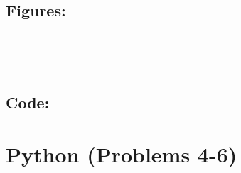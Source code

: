 \documentclass[12pt]{article}
\makeatletter
\def\maxwidth{\ifdim\Gin@nat@width>\linewidth\linewidth
	\else\Gin@nat@width\fi}
\let\Oldincludegraphics\includegraphics
\renewcommand{\includegraphics}[1]{\Oldincludegraphics[width=.8\maxwidth]{#1}}
\makeatother
\begin{document}
	\subsection*{Figures:}
	\begin{center}
	\end{center}
	{ \hspace*{\fill} \\}
		\begin{center}
	\end{center}
	{ \hspace*{\fill} \\}
	
\subsection*{Code:}
	
	
\section*{Python (Problems 4-6)}
	
\end{document}
